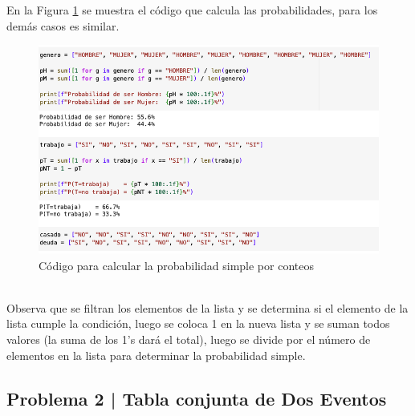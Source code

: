 \documentclass{article}
\begin{document}
\noindent
En la Figura \ref{fig:s201-1} se muestra el código que calcula las probabilidades, para los demás casos es similar.
\begin{figure}[!ht]
    \centering
    \begin{minipage}{\textwidth}
        \centering
        \includegraphics[width=\textwidth]{figures/s201-1.png}
    \end{minipage}
    \captionsetup{width=0.9\textwidth}
    \caption{Código para calcular la probabilidad simple por conteos}
    \label{fig:s201-1}
\end{figure}
\\
Observa que se filtran los elementos de la lista y se determina si el elemento de la lista cumple la condición, luego se coloca 1 en la nueva lista y se suman todos valores (la suma de los 1's dará el total), luego se divide por el número de elementos en la lista para determinar la probabilidad simple.

\clearpage

\subsection*{Problema 2 | Tabla conjunta de Dos Eventos}
\end{document}
